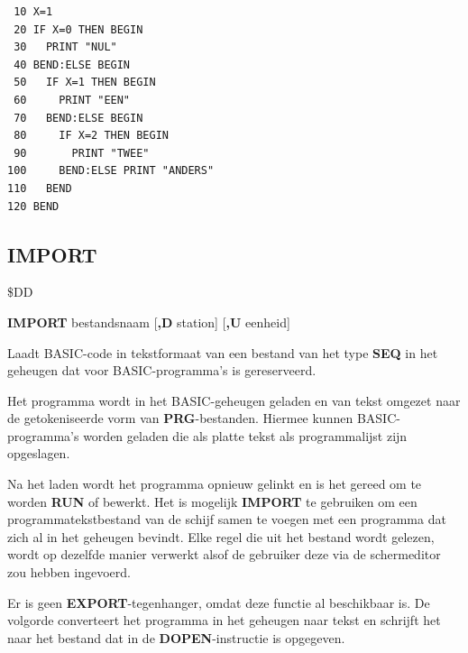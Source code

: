 \begin{description}[leftmargin=2cm,style=nextline]
\begin{tcolorbox}[colback=black,coltext=white]
\begin{verbatim}
 10 X=1
 20 IF X=0 THEN BEGIN
 30   PRINT "NUL"
 40 BEND:ELSE BEGIN
 50   IF X=1 THEN BEGIN
 60     PRINT "EEN"
 70   BEND:ELSE BEGIN
 80     IF X=2 THEN BEGIN
 90       PRINT "TWEE"
100     BEND:ELSE PRINT "ANDERS"
110   BEND
120 BEND
\end{verbatim}
\end{tcolorbox}
\end{description}


\newpage
\subsection{IMPORT}
\begin{description}[leftmargin=2cm,style=nextline]
\item [Token:]    \$DD

\item [Formaat:]   {\bf IMPORT} bestandsnaam [{\bf,D} station] [{\bf,U} eenheid]

\item [Gebruik:]    Laadt BASIC-code in tekstformaat van een bestand van het type {\bf SEQ} in het geheugen dat voor BASIC-programma's is gereserveerd.

                  \filenamedefinition

                  \drivedefinition

                  \unitdefinition

\item [Opmerkingen:]  Het programma wordt in het BASIC-geheugen geladen en van tekst omgezet naar de getokeniseerde vorm van {\bf PRG}-bestanden. Hiermee kunnen BASIC-programma's worden geladen die als platte tekst als programmalijst zijn opgeslagen.

                  Na het laden wordt het programma opnieuw gelinkt en is het gereed om te worden {\bf RUN} of bewerkt. Het is mogelijk {\bf IMPORT} te gebruiken om een programmatekstbestand van de schijf samen te voegen met een programma dat zich al in het geheugen bevindt. Elke regel die uit het bestand wordt gelezen, wordt op dezelfde manier verwerkt alsof de gebruiker deze via de schermeditor zou hebben ingevoerd.

                  Er is geen {\bf EXPORT}-tegenhanger, omdat deze functie al beschikbaar is. De volgorde  converteert het programma in het geheugen naar tekst en schrijft het naar het bestand dat in de {\bf DOPEN}-instructie is opgegeven.


\end{description}
